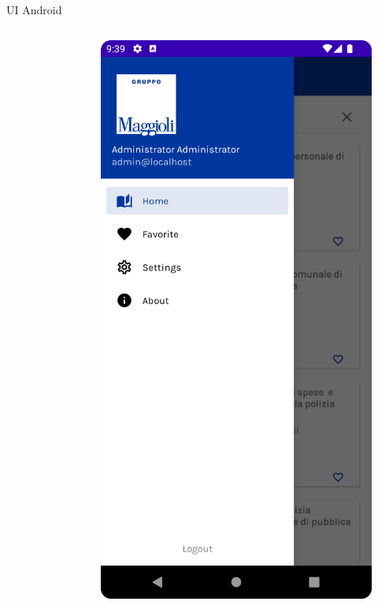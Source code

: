 \begin{frame}{UI Android}
\begin{columns}[onlytextwidth]
\begin{column}{0.24\textwidth}
\begin{figure}[H]
            \end{figure}
        \end{column}
        \begin{column}{0.24\textwidth}
             \begin{figure}[H]
                \includegraphics[width=1\textwidth]{img/sidenav.png}

\end{figure}
\end{column}
\end{columns}
\end{frame}

